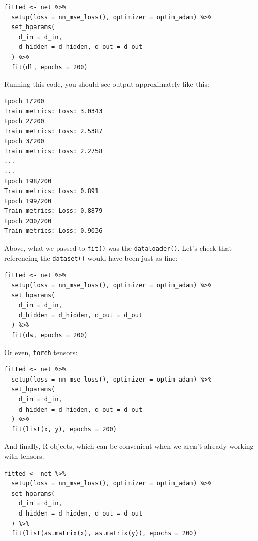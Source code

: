 \documentclass[
  letterpaper,
]{krantz}
\begin{document}
\begin{verbatim}
fitted <- net %>%
  setup(loss = nn_mse_loss(), optimizer = optim_adam) %>%
  set_hparams(
    d_in = d_in,
    d_hidden = d_hidden, d_out = d_out
  ) %>%
  fit(dl, epochs = 200)
\end{verbatim}

Running this code, you should see output approximately like this:

\begin{verbatim}
Epoch 1/200
Train metrics: Loss: 3.0343                                                                               
Epoch 2/200
Train metrics: Loss: 2.5387                                                                               
Epoch 3/200
Train metrics: Loss: 2.2758                                                                               
...
...
Epoch 198/200
Train metrics: Loss: 0.891                                                                                
Epoch 199/200
Train metrics: Loss: 0.8879                                                                               
Epoch 200/200
Train metrics: Loss: 0.9036 
\end{verbatim}

Above, what we passed to \texttt{fit()} was the \texttt{dataloader()}.
Let's check that referencing the \texttt{dataset()} would have been just
as fine:

\begin{verbatim}
fitted <- net %>%
  setup(loss = nn_mse_loss(), optimizer = optim_adam) %>%
  set_hparams(
    d_in = d_in,
    d_hidden = d_hidden, d_out = d_out
  ) %>%
  fit(ds, epochs = 200)
\end{verbatim}

Or even, \texttt{torch} tensors:

\begin{verbatim}
fitted <- net %>%
  setup(loss = nn_mse_loss(), optimizer = optim_adam) %>%
  set_hparams(
    d_in = d_in,
    d_hidden = d_hidden, d_out = d_out
  ) %>%
  fit(list(x, y), epochs = 200)
\end{verbatim}

And finally, R objects, which can be convenient when we aren't already
working with tensors.

\begin{verbatim}
fitted <- net %>%
  setup(loss = nn_mse_loss(), optimizer = optim_adam) %>%
  set_hparams(
    d_in = d_in,
    d_hidden = d_hidden, d_out = d_out
  ) %>%
  fit(list(as.matrix(x), as.matrix(y)), epochs = 200)
\end{verbatim}
\end{document}
